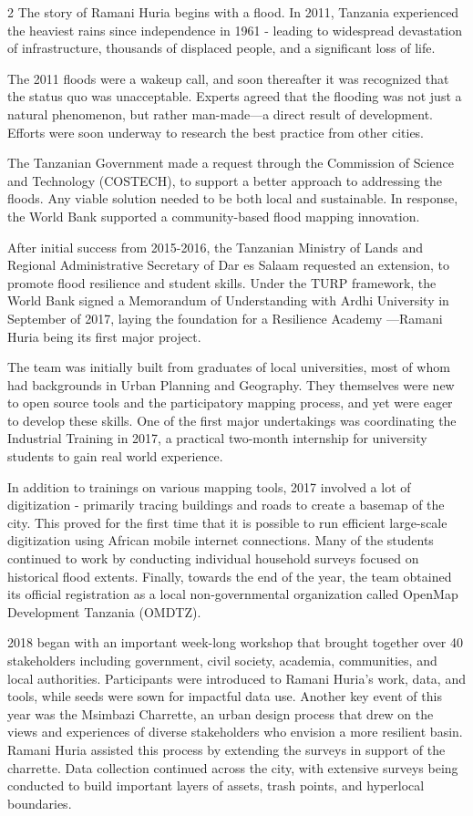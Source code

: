 \documentclass[a4paper,12pt,twoside]{article}
\begin{document}
\begin{multicols} {2}
The story of Ramani Huria begins with a flood. In 2011, Tanzania experienced the heaviest rains since independence in 1961 - leading to widespread devastation of infrastructure, thousands of displaced people, and a significant loss of life. 

The 2011 floods were a wakeup call, and soon thereafter it was recognized that the status quo was unacceptable. Experts agreed that the flooding was not just a natural phenomenon, but rather man-made—a direct result of development. Efforts were soon underway to research the best practice from other cities. 

The Tanzanian Government made a request through the Commission of Science and Technology (COSTECH), to support a better approach to addressing the floods. Any viable solution needed to be both local and sustainable. In response, the World Bank supported a community-based flood mapping innovation.

After initial success from 2015-2016, the Tanzanian Ministry of Lands and Regional Administrative Secretary of Dar es Salaam requested an extension, to promote flood resilience and student skills. Under the TURP framework, the World Bank signed a Memorandum of Understanding with Ardhi University in September of 2017, laying the foundation for a Resilience Academy —Ramani Huria being its first major project.

The team was initially built from graduates of local universities, most of whom had backgrounds in Urban Planning and Geography. They themselves were new to open source tools and the participatory mapping process, and yet were eager to develop these skills. One of the first major undertakings was coordinating the Industrial Training in 2017, a practical two-month internship for university students to gain real world experience. 

In addition to trainings on various mapping tools, 2017  involved a lot of digitization - primarily tracing buildings and roads to create a basemap of the city. This proved for the first time  that it is possible to run efficient large-scale digitization using African mobile internet connections. Many of the students continued to work by conducting individual household surveys focused on historical flood extents. Finally, towards the end of the year, the team obtained its official registration as a local non-governmental organization called OpenMap Development Tanzania (OMDTZ). 

2018 began with an important week-long workshop that brought together over 40 stakeholders including government, civil society, academia, communities, and local authorities. Participants were introduced to Ramani Huria’s work, data, and tools, while seeds were sown for impactful data use. Another key event of this year was the Msimbazi Charrette, an urban design process that drew on the views and experiences of diverse stakeholders who envision a more resilient basin. Ramani Huria assisted this process by extending the surveys in support of the charrette. Data collection continued across the city, with extensive surveys being conducted to build important layers of assets, trash points, and hyperlocal boundaries. 


\end{multicols}
\end{document}
